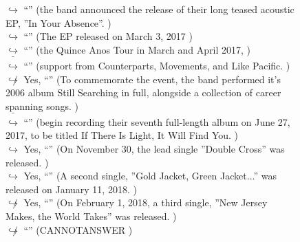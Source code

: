 \documentclass[11pt,a4paper, onecolumn]{article}
\begin{document}
\begin{figure}[t] \small \begin{tcolorbox}[boxsep=0pt,left=5pt,right=0pt,top=2pt,colback = yellow!5] \begin{dialogue}
 \small 
\colorbox{pink!25}{$\hookrightarrow$}
{ ``'' (the band announced the release of their long teased acoustic EP, ''In Your Absence''. ) }
\\
\colorbox{pink!25}{$\hookrightarrow$}
{ ``'' (The EP released on March 3, 2017 ) }
\\
\colorbox{pink!25}{$\hookrightarrow$}
{ ``'' (the Quince Anos Tour in March and April 2017, ) }
\\
\colorbox{pink!25}{ $\bar{\hookrightarrow}$}
{ ``'' (support from Counterparts, Movements, and Like Pacific. ) }
\\
\colorbox{pink!25}{$\not\hookrightarrow$}
\colorbox{red!25}{Yes,}
{ ``'' (To commemorate the event, the band performed it's 2006 album Still Searching in full, alongside a collection of career spanning songs. ) }
\\
\colorbox{pink!25}{ $\bar{\hookrightarrow}$}
{ ``'' (begin recording their seventh full-length album on June 27, 2017, to be titled If There Is Light, It Will Find You. ) }
\\
\colorbox{pink!25}{$\hookrightarrow$}
\colorbox{red!25}{Yes,}
{ ``'' (On November 30, the lead single ''Double Cross'' was released. ) }
\\
\colorbox{pink!25}{$\hookrightarrow$}
\colorbox{red!25}{Yes,}
{ ``'' (A second single, ''Gold Jacket, Green Jacket...'' was released on January 11, 2018. ) }
\\
\colorbox{pink!25}{$\not\hookrightarrow$}
\colorbox{red!25}{Yes,}
{ ``'' (On February 1, 2018, a third single, ''New Jersey Makes, the World Takes'' was released. ) }
\\
\colorbox{pink!25}{$\not\hookrightarrow$}
{ ``'' (CANNOTANSWER ) }
\\
 \end{dialogue}\end{tcolorbox}\end{figure}
\end{document}
